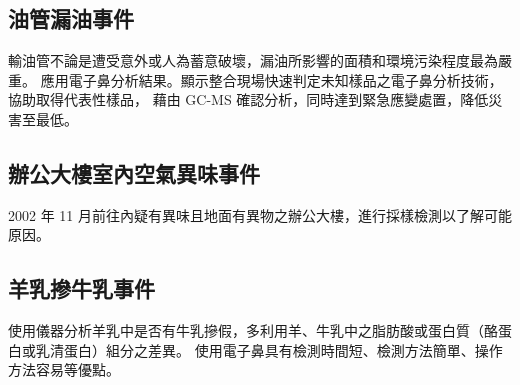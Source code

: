 	\subsection{油管漏油事件}
	輸油管不論是遭受意外或人為蓄意破壞，漏油所影響的面積和環境污染程度最為嚴重。
	應用電子鼻分析結果。顯示整合現場快速判定未知樣品之電子鼻分析技術，協助取得代表性樣品，
	藉由 GC-MS 確認分析，同時達到緊急應變處置，降低災害至最低。
	\subsection{辦公大樓室內空氣異味事件}
	2002 年 11 月前往內疑有異味且地面有異物之辦公大樓，進行採樣檢測以了解可能原因。
	\subsection{羊乳摻牛乳事件}
	使用儀器分析羊乳中是否有牛乳摻假，多利用羊、牛乳中之脂肪酸或蛋白質（酪蛋白或乳清蛋白）組分之差異。
	使用電子鼻具有檢測時間短、檢測方法簡單、操作方法容易等優點。